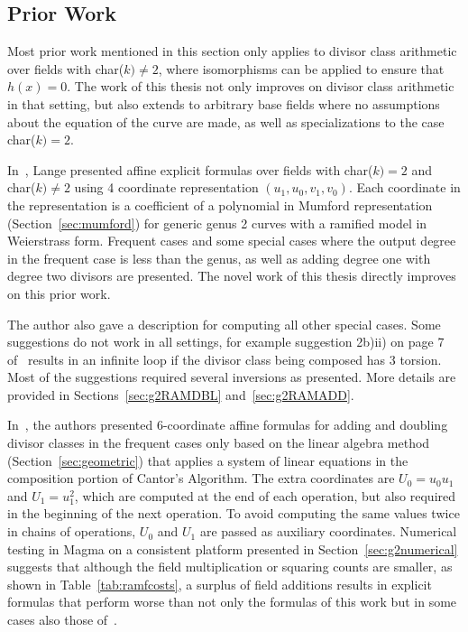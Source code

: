 \subsection{Prior Work}
\label{sec:g2explRAMPriorWork}
Most prior work mentioned in this section only applies to divisor class
arithmetic over fields with char($k) \not = 2$, where isomorphisms can be
applied to ensure that $h(x) = 0$. The work of this thesis not only improves on
divisor class arithmetic in that setting, but also extends to arbitrary base
fields where no assumptions about the equation of the curve are made,  as well as
specializations to the case char($k) = 2$.

In~\cite{Lange_explicit_2005}, Lange presented affine explicit formulas over
fields with char($k) = 2$ and char($k) \not = 2$ using 4 coordinate
representation $(u_1,u_0,v_1,v_0)$. Each coordinate in the representation is a coefficient of
a polynomial in Mumford representation (Section~\ref{sec:mumford}) for
generic genus 2 curves with a ramified model in Weierstrass form. Frequent cases
and some special cases where the output degree in the frequent case is less than
the genus, as well as adding degree one with degree two divisors are presented.
The novel work of this thesis directly improves on this prior work.

The author also gave a description for computing all other special cases. Some
suggestions do not work in all settings, for example suggestion 2b)ii) on page
7 of~\cite[Section~4.1]{Lange_explicit_2005} results in an infinite loop if the
divisor class being composed has 3 torsion. Most of the suggestions required
several inversions as presented. More details are provided in
Sections~\ref{sec:g2RAMDBL} and~\ref{sec:g2RAMADD}.

In~\cite{CostelloLauter_geo_2011}, the authors presented $6$-coordinate affine
formulas for adding and doubling divisor classes in the frequent cases only
based on the linear algebra method (Section~\ref{sec:geometric}) that applies a
system of linear equations in the composition portion of Cantor's Algorithm. The
extra coordinates are $U_0 = u_0u_1$ and $U_1=u_1^2$, which are computed at the
end of each operation, but also required in the beginning of the next operation.
To avoid computing the same values twice in chains of operations, $U_0$ and
$U_1$ are passed as auxiliary coordinates. Numerical testing in Magma on a
consistent platform presented in Section~\ref{sec:g2numerical} suggests that
although the field multiplication or squaring counts are smaller, as shown in
Table~\ref{tab:ramfcosts}, a surplus of field additions results in explicit
formulas that perform worse than not only the formulas of this work but in some
cases also those of~\cite{Lange_explicit_2005}.

